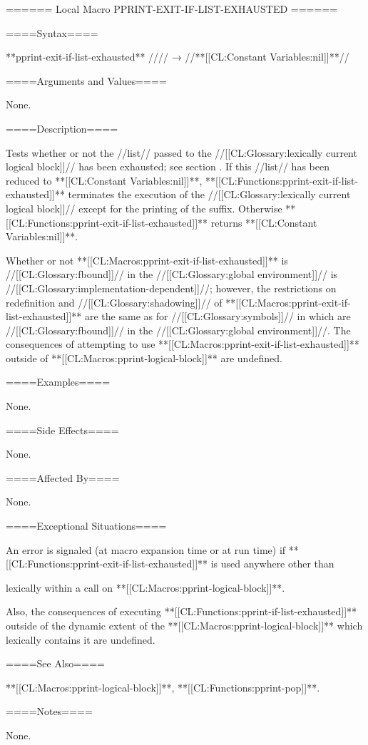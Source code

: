 ====== Local Macro PPRINT-EXIT-IF-LIST-EXHAUSTED ======

====Syntax====

**pprint-exit-if-list-exhausted** //\noargs// → //**[[CL:Constant Variables:nil]]**//

====Arguments and Values====

None.

====Description====

Tests whether or not the //list// passed to the //[[CL:Glossary:lexically current logical block]]// has been exhausted; see section {\secref\DynamicControlofOutput}. If this //list// has been reduced to **[[CL:Constant Variables:nil]]**, **[[CL:Functions:pprint-exit-if-list-exhausted]]** terminates the execution of the //[[CL:Glossary:lexically current logical block]]// except for the printing of the suffix. Otherwise **[[CL:Functions:pprint-exit-if-list-exhausted]]** returns **[[CL:Constant Variables:nil]]**.

Whether or not **[[CL:Macros:pprint-exit-if-list-exhausted]]** is //[[CL:Glossary:fbound]]// in the //[[CL:Glossary:global environment]]// is //[[CL:Glossary:implementation-dependent]]//; however, the restrictions on redefinition and //[[CL:Glossary:shadowing]]// of **[[CL:Macros:pprint-exit-if-list-exhausted]]** are the same as for //[[CL:Glossary:symbols]]// in  which are //[[CL:Glossary:fbound]]// in the //[[CL:Glossary:global environment]]//. The consequences of attempting to use **[[CL:Macros:pprint-exit-if-list-exhausted]]** outside of **[[CL:Macros:pprint-logical-block]]** are undefined.

====Examples====

None.

====Side Effects====

None.

====Affected By====

None.

====Exceptional Situations====

An error is signaled (at macro expansion time or at run time) if **[[CL:Functions:pprint-exit-if-list-exhausted]]** is used anywhere other than

lexically within a call on **[[CL:Macros:pprint-logical-block]]**.

Also, the consequences of executing **[[CL:Functions:pprint-if-list-exhausted]]** outside of the dynamic extent of the **[[CL:Macros:pprint-logical-block]]** which lexically contains it are undefined.

====See Also====

**[[CL:Macros:pprint-logical-block]]**, **[[CL:Functions:pprint-pop]]**.

====Notes====

None.

 

